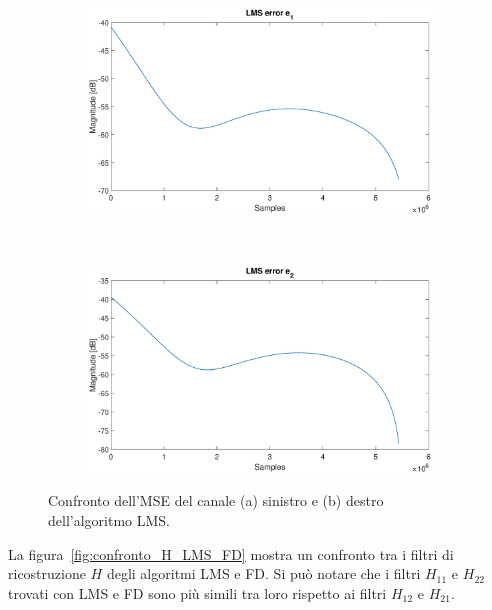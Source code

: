 \documentclass[12pt,a4paper,titlepage]{article}
\begin{document}
\begin{figure}[h]
	\begin{subfigure}{1\textwidth}
		\includegraphics[width=1\textwidth]{Immagini/mse_e1}
		\caption{}
		\label{mse_e1}
	\end{subfigure}\\
	\begin{subfigure}{1\textwidth}
		\includegraphics[width=1\textwidth]{Immagini/mse_e2}
		\caption{}
		\label{mse_e2}
	\end{subfigure}
	\caption{Confronto dell'MSE del canale (a) sinistro e (b) destro dell'algoritmo LMS.}
	\label{fig:mse_LMS}
\end{figure}

La figura~\ref{fig:confronto_H_LMS_FD} mostra un confronto tra i filtri di ricostruzione $H$ degli algoritmi LMS e FD. Si può notare che i filtri $H_{11}$ e $H_{22}$ trovati con LMS e FD sono più simili tra loro rispetto ai filtri $H_{12}$ e $H_{21}$.
\end{document}

